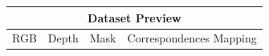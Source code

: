 \begin{table}[htb]
    \centering
    \begin{tabular}{ccccc}
        \hline
        \multicolumn{5}{c}{Dataset Preview}                                                                                                                                                                                                                                                                                                                                                               \\ \hline
        \multicolumn{1}{c}{RGB}                                                    & \multicolumn{1}{c}{Depth}                                                 & \multicolumn{1}{c|}{Mask}                                                    & \multicolumn{2}{c}{Correspondences Mapping}                                                                                                               \\

\end{tabular}
\end{table}

